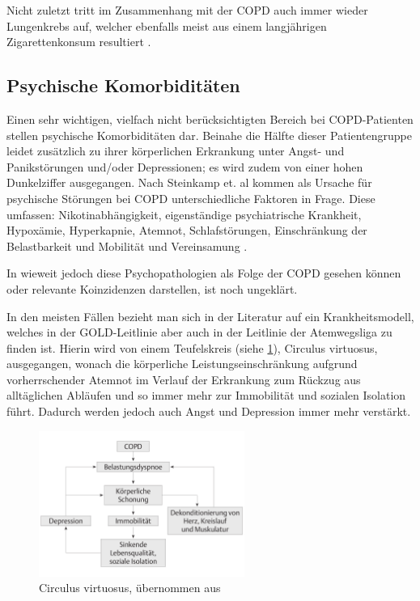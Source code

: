 Nicht zuletzt tritt im Zusammenhang mit der COPD auch immer wieder Lungenkrebs auf, welcher ebenfalls meist aus einem langjährigen Zigarettenkonsum resultiert \autocite[vgl.][38]{stiefelhagen2013}.


\subsection{Psychische Komorbiditäten}
\label{psychische_komorbiditaet}
Einen sehr wichtigen, vielfach nicht berücksichtigten Bereich bei COPD-Patienten stellen psychische Komorbiditäten dar.  Beinahe die Hälfte dieser Patientengruppe leidet zusätzlich zu ihrer körperlichen Erkrankung unter Angst- und Panikstörungen und/oder Depressionen; es wird zudem von einer hohen Dunkelziffer ausgegangen. Nach Steinkamp et. al kommen als Ursache für psychische Störungen bei COPD unterschiedliche Faktoren in Frage. Diese umfassen: Nikotinabhängigkeit, eigenständige psychiatrische Krankheit, Hypoxämie, Hyperkapnie, Atemnot, Schlafstörungen, Einschränkung der Belastbarkeit und Mobilität und Vereinsamung \autocite[vgl.][157]{fischer2007}.
 
In wieweit jedoch diese Psychopathologien als Folge der COPD gesehen können oder relevante Koinzidenzen darstellen, ist noch ungeklärt. 

In den meisten Fällen bezieht man sich in der Literatur auf ein Krankheitsmodell, welches in der GOLD-Leitlinie aber auch in der Leitlinie der Atemwegsliga zu finden ist. Hierin wird von einem Teufelskreis (siehe \ref{fig:copd_teufelskreis}), Circulus virtuosus, ausgegangen, wonach die körperliche Leistungseinschränkung aufgrund vorherrschender Atemnot im Verlauf der Erkrankung zum Rückzug aus alltäglichen Abläufen und so immer mehr zur Immobilität und sozialen Isolation führt. 
Dadurch werden jedoch auch Angst und Depression immer mehr verstärkt. 

\begin{figure}
 \centering
  \includegraphics[width=0.6\textwidth]{teufelskreis}
  \caption{Circulus virtuosus, übernommen aus \cite[e19]{vogelmeier2007}}
  \label{fig:copd_teufelskreis}
\end{figure}

